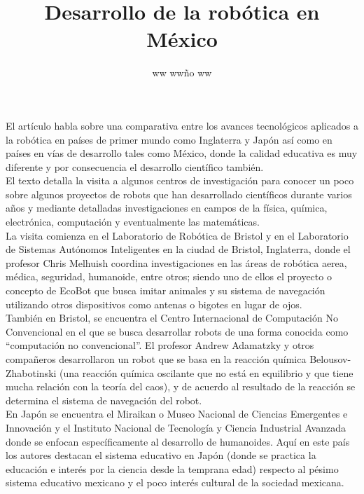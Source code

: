 \documentclass{article}
\title{Desarrollo de la rob\'otica en México}
\author{ww ww\~no ww}
\date{} %
\begin{document}
	\maketitle
	\normalsize{
El art\'iculo habla sobre una comparativa entre los avances tecnol\'ogicos aplicados a la rob\'otica en países de primer mundo como Inglaterra y Jap\'on así como en pa\'ises en v\'ias de desarrollo tales como M\'exico, donde la calidad educativa es muy diferente y por consecuencia el desarrollo cient\'ifico tambi\'en.
\\

El texto detalla la visita a algunos centros de investigación para conocer un poco sobre algunos proyectos de robots que han desarrollado científicos durante varios años y mediante detalladas investigaciones en campos de la física, química, electrónica, computación y eventualmente las matemáticas.
\\

La visita comienza en el Laboratorio de Robótica de Bristol y en el Laboratorio de Sistemas Autónomos Inteligentes en la ciudad de Bristol, Inglaterra, donde el profesor Chris Melhuish coordina investigaciones en las áreas de robótica aerea, médica, seguridad, humanoide, entre otros; siendo uno de ellos el proyecto o concepto de EcoBot que busca imitar animales y su sistema de navegación utilizando otros dispositivos como antenas o bigotes en lugar de ojos.
\\

También en Bristol, se encuentra el Centro Internacional de Computación No Convencional en el que se busca desarrollar robots de una forma conocida como “computación no convencional”. El profesor Andrew Adamatzky y otros compañeros desarrollaron un robot que se basa en la reacción química Belousov-Zhabotinski (una reacción química oscilante que no está en equilibrio y que tiene mucha relación con la teoría del caos), y de acuerdo al resultado de la reacción se determina el sistema de navegación del robot.
\\

En Japón se encuentra el Miraikan o Museo Nacional de Ciencias Emergentes e Innovación y el Instituto Nacional de Tecnología y Ciencia Industrial Avanzada donde se enfocan específicamente al desarrollo de humanoides. Aquí en este país los autores destacan el sistema educativo en Japón (donde se practica la educación e interés por la ciencia desde la temprana edad) respecto al pésimo sistema educativo mexicano y el poco interés cultural de la sociedad mexicana.
\\

}
\end{document}
